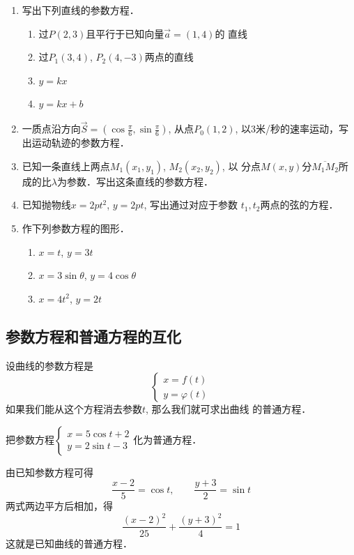 \begin{ex}
\begin{enumerate}
    \item 写出下列直线的参数方程．
\begin{enumerate}
    \item 过$P(2,3)$且平行于已知向量$\vec{a}=(1,4)$的
    直线
    \item 过$P_1(3,4)$, $P_2(4,-3)$两点的直线
    \item $y=kx$
    \item $y=kx+b$
\end{enumerate}
\item 一质点沿方向$\vec{S}=\left(\cos\frac{\pi}{6},\sin\frac{\pi}{6}\right)$, 
从点$P_0(1,2)$, 
以3米/秒的速率运动，写出运动轨迹的参数方程．
\item 已知一条直线上两点$M_1(x_1,y_1)$, $M_2(x_2,y_2)$, 以
分点$M(x,y)$分$\overline{M_1M_2}$所成的比$\lambda$为参数．写出这条直线的参数方程．
\item 已知抛物线$x=2pt^2$, $y=2pt$, 写出通过对应于参数
$t_1,t_2$两点的弦的方程．
\item 作下列参数方程的图形．
\begin{enumerate}
\item $x=t$, $y=3t$
\item $x=3\sin\theta$, $y=4\cos\theta$
\item $x=4t^2$, $y=2t$
\end{enumerate}
\end{enumerate}
\end{ex}

\subsection{参数方程和普通方程的互化}
设曲线的参数方程是
\[\begin{cases}
   x=f(t)\\
y=\varphi(t) 
\end{cases}\]
如果我们能从这个方程消去参数$t$, 那么我们就可求出曲线
的普通方程．
 
\begin{example}
    把参数方程$\begin{cases}
        x=5\cos t+2\\
y=2\sin t-3
    \end{cases}$化为普通方程．
\end{example}

\begin{solution}
    由已知参数方程可得
\[\frac{x-2}{5}=\cos t,\qquad \frac{y+3}{2}=\sin t\]
两式两边平方后相加，得
\[\frac{(x-2)^2}{25}+\frac{(y+3)^2}{4}=1\]
这就是已知曲线的普通方程．
\end{solution}

